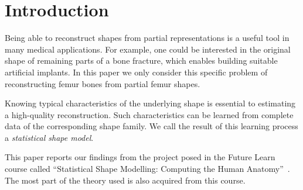 \section{Introduction}
\label{sec:intro}

Being able to reconstruct shapes from partial representations is a useful tool in many medical applications.
For example, one could be interested in the original shape of remaining parts of a bone fracture, which enables building suitable artificial implants.
In this paper we only consider this specific problem of reconstructing femur bones from partial femur shapes.

Knowing typical characteristics of the underlying shape is essential to estimating a high-quality reconstruction.
Such characteristics can be learned from complete data of the corresponding shape family.
We call the result of this learning process a \emph{statistical shape model}.

This paper reports our findings from the project posed in the Future Learn course called ``Statistical Shape Modelling: Computing the Human Anatomy''~\cite{mooc2019statistical}.
The most part of the theory used is also acquired from this course.
